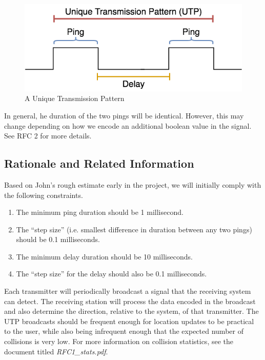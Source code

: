 \documentclass[12pt]{article}
\begin{document}
\begin{figure}[h]
\centering
\includegraphics[scale=0.5]{utp}

\caption{A Unique Transmission Pattern}\label{fig:utp}
\end{figure}

In general, he duration of the two pings will be identical.
However, this may change depending on how we encode an additional boolean
value in the signal.
See RFC 2 for more details.

\subsection{Rationale and Related Information} \label{rationale}

Based on John's rough estimate early in the project, we will initially
comply with the following constraints.

\begin{enumerate} \itemsep -2pt
	\item The minimum ping duration should be 1 millisecond.
	\item The ``step size'' (i.e. smallest difference in duration between
		any two pings) should be 0.1 milliseconds.
	\item The minimum delay duration should be 10 milliseconds.
	\item The ``step size'' for the delay should also be 0.1 milliseconds.
\end{enumerate}

Each transmitter will periodically broadcast a signal that the receiving
system can detect.
The receiving station will process the data encoded in the broadcast and
also determine the direction, relative to the system, of that transmitter.
The UTP broadcasts should be frequent enough for location updates to be
practical to the user, while also being
infrequent enough that the expected number of collisions is very low.
For more information on collision statistics, see the document titled
{\em RFC1\_stats.pdf}.
\end{document}
